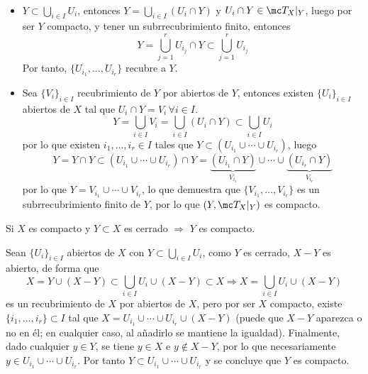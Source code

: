 \begin{dem} \,
\begin{itemize}
    \item[$\Rightarrow)$] $Y\subset \displaystyle \bigcup_{i \in I} U_i$, entonces $Y= \displaystyle \bigcup_{i \in I} (U_i\cap Y)$ y $ U_i\cap Y \in \mc T_X|_Y$, luego por ser $Y$ compacto, y tener un subrrecubrimiento finito, entonces
    $$Y = \bigcup_{j=1}^r U_{i_j} \cap Y \subset \bigcup_{j=1}^r U_{i_j}$$
    Por tanto, $\{U_{i_1}, \ldots, U_{i_r}\}$ recubre a $Y$.
    \item[$\Leftarrow)$] Sea $\{ V_i \}_{i\in I}$ recubrimiento de $Y$ por abiertos de $Y$, entonces existen $\{U_i\}_{i\in I}$ abiertos de $X$ tal que $U_i \cap Y = V_i\, \forall i \in I$. 
    $$Y = \bigcup_{i\in I} V_i = \bigcup_{i\in I} (U_i \cap Y) \subset \bigcup_{i\in I} U_i$$
    por lo que existen $i_1, \ldots, i_r \in I$ tales que $Y \subset (U_{i_1} \cup \cdots \cup U_{i_r})$, luego
    $$Y = Y \cap Y \subset (U_{i_1} \cup \cdots \cup U_{i_r}) \cap Y = \underbrace{(U_{i_1}\cap Y)}_{V_{i_1}} \cup \cdots \cup \underbrace{(U_{i_r}\cap Y)}_{V_{i_r}}$$
    por lo que $Y = V_{i_1} \cup \cdots \cup V_{i_r}$, lo que demuestra que $\{V_{i_1}, \ldots, V_{i_r}\}$ es un subrrecubrimiento finito de $Y$, por lo que $(Y,\mc T_X|_Y)$ es compacto. 
\end{itemize}
\end{dem}
\begin{prop}
Si $X$ es compacto y $Y \subset X$ es cerrado $\Rightarrow$ $Y$ es compacto. 
\end{prop}
\begin{dem}
Sean $\{U_i\}_{i\in I}$ abiertos de $X$ con $\displaystyle Y \subset \bigcup_{i\in I} U_i$, como $Y$ es cerrado, $X-Y$ es abierto, de forma que 
$$X = Y \cup (X-Y) \subset \bigcup_{i\in I} U_i \cup (X-Y) \subset X \Rightarrow X = \bigcup_{i\in I} U_i \cup (X-Y)$$
es un recubrimiento de $X$ por abiertos de $X$, pero por ser $X$ compacto, existe $\{i_1, \ldots, i_r \} \subset I$ tal que $X = U_{i_1} \cup \cdots \cup U_{i_r} \cup (X-Y)$ (puede que $X-Y$ aparezca o no en él; en cualquier caso, al añadirlo se mantiene la igualdad). Finalmente, dado cualquier $y \in Y$, se tiene $y \in X$ e $y \nin X-Y$, por lo que necesariamente $y \in U_{i_1} \cup \cdots \cup U_{i_r}$. Por tanto $Y \subset U_{i_1} \cup \cdots \cup U_{i_r}$ y se concluye que $Y$ es compacto. 
\end{dem}
